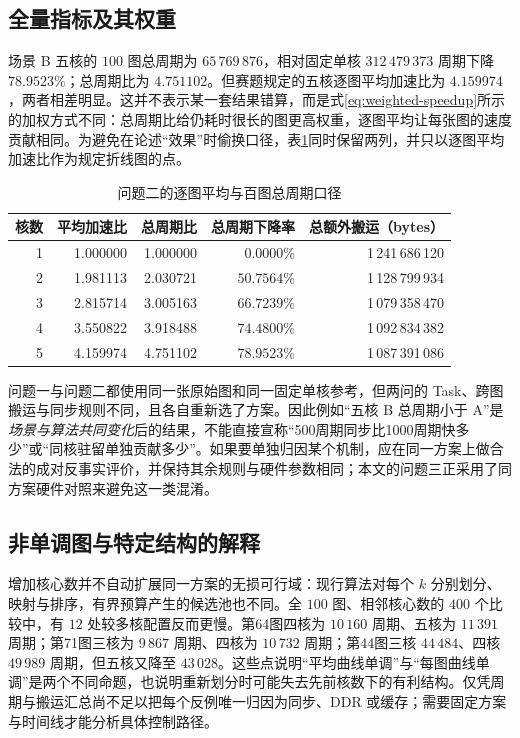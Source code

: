 \subsection{全量指标及其权重}
场景 B 五核的 $100$ 图总周期为 $65\,769\,876$，相对固定单核 $312\,479\,373$ 周期下降 $78.9523\%$；总周期比为 $4.751102$。但赛题规定的五核逐图平均加速比为 $4.159974$，两者相差明显。这并不表示某一套结果错算，而是式\eqref{eq:weighted-speedup}所示的加权方式不同：总周期比给仍耗时很长的图更高权重，逐图平均让每张图的速度贡献相同。为避免在论述“效果”时偷换口径，表\ref{tab:q2-metric-perspective}同时保留两列，并只以逐图平均加速比作为规定折线图的点。
\begin{table}[!htbp]\centering
\caption{问题二的逐图平均与百图总周期口径}\label{tab:q2-metric-perspective}
\begin{tabular}{rrrrr}
\toprule
核数 & 平均加速比 & 总周期比 & 总周期下降率 & 总额外搬运（bytes）\\
\midrule
1 & 1.000000 & 1.000000 & $0.0000\%$ & 1\,241\,686\,120\\
2 & 1.981113 & 2.030721 & $50.7564\%$ & 1\,128\,799\,934\\
3 & 2.815714 & 3.005163 & $66.7239\%$ & 1\,079\,358\,470\\
4 & 3.550822 & 3.918488 & $74.4800\%$ & 1\,092\,834\,382\\
5 & 4.159974 & 4.751102 & $78.9523\%$ & 1\,087\,391\,086\\
\bottomrule
\end{tabular}
\end{table}
问题一与问题二都使用同一张原始图和同一固定单核参考，但两问的 Task、跨图搬运与同步规则不同，且各自重新选了方案。因此例如“五核 B 总周期小于 A”是\emph{场景与算法共同变化}后的结果，不能直接宣称“500周期同步比1000周期快多少”或“同核驻留单独贡献多少”。如果要单独归因某个机制，应在同一方案上做合法的成对反事实评价，并保持其余规则与硬件参数相同；本文的问题三正采用了同方案硬件对照来避免这一类混淆。

\subsection{非单调图与特定结构的解释}
增加核心数并不自动扩展同一方案的无损可行域：现行算法对每个 $k$ 分别划分、映射与排序，有界预算产生的候选池也不同。全 $100$ 图、相邻核心数的 $400$ 个比较中，有 $12$ 处较多核配置反而更慢。第64图四核为 $10\,160$ 周期、五核为 $11\,391$ 周期；第71图三核为 $9\,867$ 周期、四核为 $10\,732$ 周期；第44图三核 $44\,484$、四核 $49\,989$ 周期，但五核又降至 $43\,028$。这些点说明“平均曲线单调”与“每图曲线单调”是两个不同命题，也说明重新划分时可能失去先前核数下的有利结构。仅凭周期与搬运汇总尚不足以把每个反例唯一归因为同步、DDR 或缓存；需要固定方案与时间线才能分析具体控制路径。

